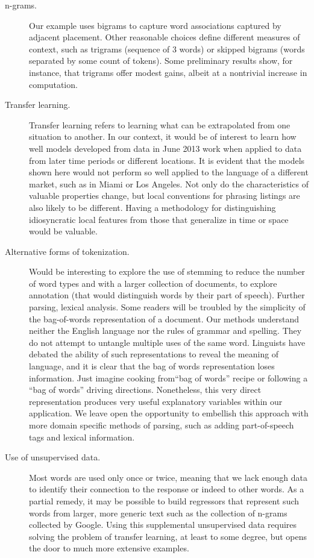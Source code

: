 \documentclass[12pt]{article}
\begin{document}
   \begin{description}
   
   \item[n-grams.]  Our example uses bigrams to capture word associations captured by adjacent placement.  Other reasonable choices define different measures of context,  such as trigrams (sequence of 3 words) or skipped bigrams (words separated by some count of tokens).  Some preliminary results show, for instance, that trigrams offer modest gains, albeit at a nontrivial increase in computation.
   
   \item[Transfer learning.]  Transfer learning refers to learning what can be extrapolated from one situation to another.  In our context, it would be of interest to learn how well models developed from data in June 2013 work when applied to data from later time periods or different locations.  It is evident that the models shown here would not perform so well applied to the language of a different market, such as in Miami or Los Angeles.  Not only do the characteristics of valuable properties change, but  local conventions for phrasing listings are also likely to be different.  Having a methodology for distinguishing idiosyncratic local features from those that generalize in time or space would be valuable. 
   
  \item[Alternative forms of tokenization.] Would be interesting to explore the use of stemming to reduce the number of word types and with a larger collection of documents, to explore annotation (that would distinguish words by their part of speech).  Further parsing, lexical analysis.  Some readers will be troubled by the simplicity of the  bag-of-words representation of a document.  Our methods understand neither the English language nor the rules of grammar and spelling.  They do not attempt to untangle  multiple uses of the same word.  Linguists have debated the ability of such  representations to reveal the meaning of language, and it is clear that the bag of words representation loses information.  Just imagine cooking from``bag of words'' recipe or following a ``bag of words'' driving directions.  Nonetheless, this very direct representation produces very useful explanatory variables within our application.  We leave open the opportunity to embellish this approach with more domain specific methods of parsing, such as adding part-of-speech tags and lexical information.
   
   \item[Use of unsupervised data.] Most words are used only once or twice, meaning that we lack enough data to identify their connection to the response or indeed to other words.  As a partial remedy, it may be possible to build regressors that represent such words from larger, more generic text such as the collection of n-grams collected by Google.  Using this supplemental unsupervised data requires solving the problem of transfer learning, at least to some degree, but opens the door to much more extensive examples. 
   

\end{description}
\end{document}
